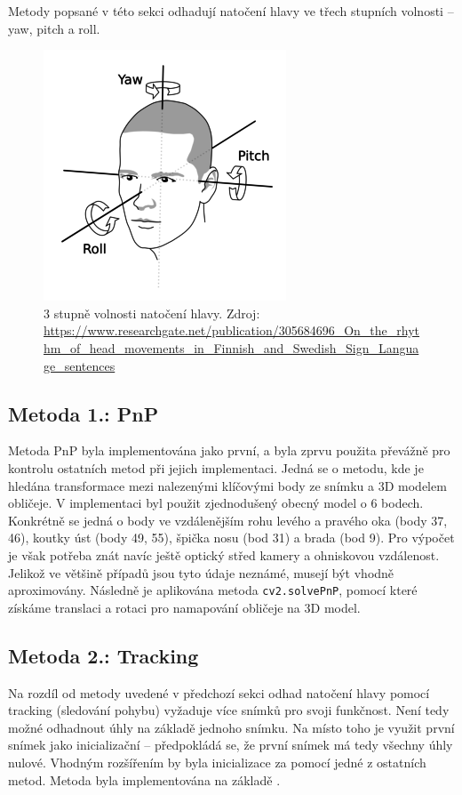 \documentclass[12pt,a4paper,titlepage,final]{report}
\begin{document}
Metody popsané v této sekci odhadují natočení hlavy ve třech stupních volnosti -- yaw, pitch a roll. 

\begin{figure}[H]
    \centering
    \includegraphics[scale=2]{images/yaw_pitch_roll.png}
    \caption{3 stupně volnosti natočení hlavy. Zdroj: \url{https://www.researchgate.net/publication/305684696_On_the_rhythm_of_head_movements_in_Finnish_and_Swedish_Sign_Language_sentences}}
    \label{fig:yaw_pitch_roll}
\end{figure}

\subsection{Metoda 1.: PnP}
Metoda PnP byla implementována jako první, a byla zprvu použita převážně pro kontrolu ostatních metod při jejich implementaci. Jedná se o metodu, kde je hledána transformace mezi nalezenými klíčovými body ze snímku a 3D modelem obličeje. V implementaci byl použit zjednodušený obecný model o 6 bodech. Konkrétně se jedná o body ve vzdálenějším rohu levého a pravého oka (body 37, 46), koutky úst (body 49, 55), špička nosu (bod 31) a brada (bod 9). Pro výpočet je však potřeba znát navíc ještě optický střed kamery a ohniskovou vzdálenost. Jelikož ve většině případů jsou tyto údaje neznámé, musejí být vhodně aproximovány. Následně je aplikována metoda \texttt{cv2.solvePnP}, pomocí které získáme translaci a rotaci pro namapování obličeje na 3D model.
\subsection{Metoda 2.: Tracking}
Na rozdíl od metody uvedené v předchozí sekci odhad natočení hlavy pomocí tracking (sledování pohybu) vyžaduje více snímků pro svoji funkčnost. Není tedy možné odhadnout úhly na základě jednoho snímku. Na místo toho je využit první snímek jako inicializační -- předpokládá se, že první snímek má tedy všechny úhly nulové. Vhodným rozšířením by byla inicializace za pomocí jedné z ostatních metod. Metoda byla implementována na základě \cite{est_for_mobile}.
\end{document}
